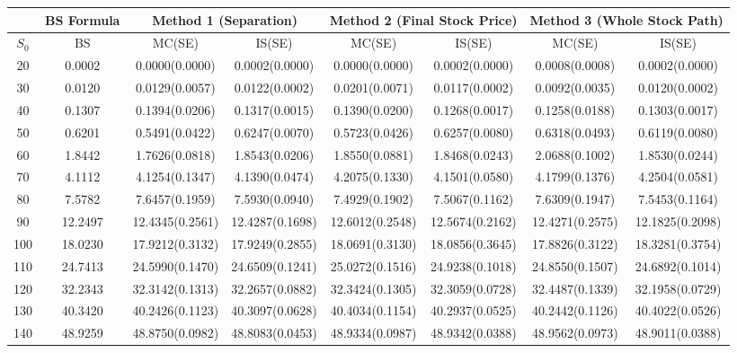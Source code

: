 \documentclass[12pt]{article}  %
\numberwithin{equation}{subsection}
\theoremstyle{plain}
\begin{document}
\begin{table}  %
\begin{center}
\begin{tabular}{cccccccc}\toprule
\  & BS Formula & \multicolumn{2}{c}{Method 1 (Separation)} & \multicolumn{2}{c}{Method 2 (Final Stock Price)} & \multicolumn{2}{c}{Method 3 (Whole Stock Path)} \\ \midrule
$S_0$ & BS & MC(SE) & IS(SE) & MC(SE) & IS(SE) & MC(SE) & IS(SE)\\ \midrule
20 & 0.0002 & 0.0000(0.0000) & 0.0002(0.0000) & 0.0000(0.0000) & 0.0002(0.0000) & 0.0008(0.0008) & 0.0002(0.0000) \\
30 & 0.0120 & 0.0129(0.0057) & 0.0122(0.0002) & 0.0201(0.0071) & 0.0117(0.0002) & 0.0092(0.0035) & 0.0120(0.0002) \\
40 & 0.1307 & 0.1394(0.0206) & 0.1317(0.0015) & 0.1390(0.0200) & 0.1268(0.0017) & 0.1258(0.0188) & 0.1303(0.0017) \\
50 & 0.6201 & 0.5491(0.0422) & 0.6247(0.0070) & 0.5723(0.0426) & 0.6257(0.0080) & 0.6318(0.0493) & 0.6119(0.0080) \\
60 & 1.8442 & 1.7626(0.0818) & 1.8543(0.0206) & 1.8550(0.0881) & 1.8468(0.0243) & 2.0688(0.1002) & 1.8530(0.0244) \\
70 & 4.1112 & 4.1254(0.1347) & 4.1390(0.0474) & 4.2075(0.1330) & 4.1501(0.0580) & 4.1799(0.1376) & 4.2504(0.0581) \\
80 & 7.5782 & 7.6457(0.1959) & 7.5930(0.0940) & 7.4929(0.1902) & 7.5067(0.1162) & 7.6309(0.1947)& 7.5453(0.1164) \\
90 & 12.2497 & 12.4345(0.2561) & 12.4287(0.1698) & 12.6012(0.2548) & 12.5674(0.2162) & 12.4271(0.2575) & 12.1825(0.2098) \\
100 & 18.0230 & 17.9212(0.3132) & 17.9249(0.2855) & 18.0691(0.3130) & 18.0856(0.3645) & 17.8826(0.3122) & 18.3281(0.3754) \\
110 & 24.7413 & 24.5990(0.1470) & 24.6509(0.1241) & 25.0272(0.1516) & 24.9238(0.1018) & 24.8550(0.1507) & 24.6892(0.1014) \\
120 & 32.2343 & 32.3142(0.1313) & 32.2657(0.0882) & 32.3424(0.1305) & 32.3059(0.0728) & 32.4487(0.1339) & 32.1958(0.0729) \\
130 & 40.3420 & 40.2426(0.1123) & 40.3097(0.0628) & 40.4034(0.1154) & 40.2937(0.0525) & 40.2442(0.1126) & 40.4022(0.0526) \\
140 & 48.9259 & 48.8750(0.0982) & 48.8083(0.0453) & 48.9334(0.0987) & 48.9342(0.0388) & 48.9562(0.0973) & 48.9011(0.0388) \\

\end{tabular}
\end{center}
\end{table}
\end{document}
